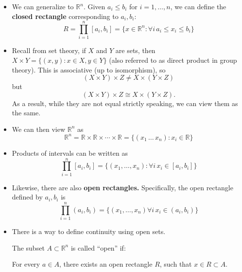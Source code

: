 \begin{itemize}
\begin{center}
\begin{tikzpicture}
        \end{tikzpicture}
    \end{center}
    \item We can generalize to $\mathbb{R}^n$. Given $a_i \le b_i$ for $i=1,\dots,n$, we can define the \textbf{closed rectangle} corresponding to $a_i,b_i$:
    \begin{equation}
        R = \prod_{i=1}^n [a_i,b_i] = \{x\in \mathbb{R}^n: \forall i\, a_i \le x_i \le b_i\}
    \end{equation}
    \item Recall from set theory, if $X$ and $Y$ are sets, then $X \times Y = \{(x,y): x\in X, y\in Y\}$ (also referred to as direct product in group theory). This is associative (up to isomorphism), so 
    \begin{equation}
        (X\times Y) \times Z \neq X \times (Y\times Z)
    \end{equation}
    but 
    \begin{equation}
        (X\times Y) \times Z \cong X \times (Y\times Z).
    \end{equation}
    As a result, while they are not equal strictly speaking, we can view them as the same.
    \item We can then view $\mathbb{R}^n$ as
    \begin{equation}
        \mathbb{R}^n = \mathbb{R} \times \mathbb{R} \times \cdots \times \mathbb{R} = \{(x_1\,\dots\, x_n):x_i \in \mathbb{R}\}
    \end{equation}
    \item Products of intervals can be written as 
    \begin{equation}
        \prod_{i=1}^n [a_i,b_i] = \{(x_1,\dots,x_n): \forall i\, x_i \in [a_i,b_i]\}
    \end{equation}
    \item Likewise, there are also \textbf{open rectangles.} Specifically, the open rectangle defined by $a_i,b_i$ is 
    \begin{equation}
        \prod_{i=1}^n (a_i,b_i) = \{ (x_1,\dots,x_n) \forall i\, x_i \in (a_i,b_i)\}
    \end{equation}
    \item There is a way to define continuity using open sets.
    \begin{definition}
        The subset $A \subset \mathbb{R}^n$ is called ``open'' if: 
        \vspace{2mm}
        
        For every $a\in A$, there exists an open rectangle $R$, such that $x\in R \subset A$.
    \end{definition}
\end{itemize}
